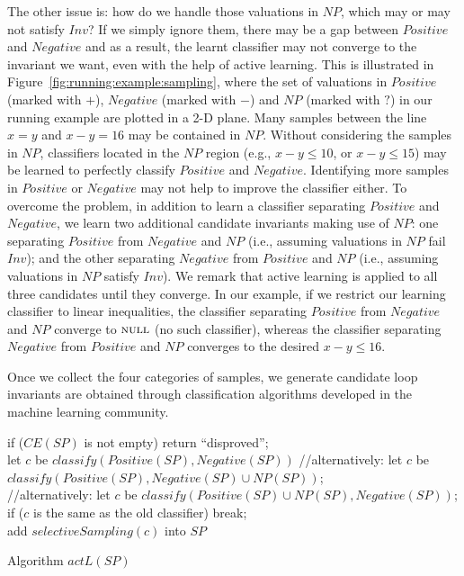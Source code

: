 The other issue is: how do we handle those valuations in $NP$, which may or may not satisfy $Inv$? If we simply ignore them, there may be a gap between $Positive$ and $Negative$ and as a result, the learnt classifier may not converge to the invariant we want, even with the help of active learning.
This is illustrated in Figure~\ref{fig:running:example:sampling}, where the set of valuations in $Positive$ (marked with $+$), $Negative$ (marked with $-$) and $NP$ (marked with $?$) in our running example are plotted in a 2-D plane. Many samples between the line $x=y$ and $x-y=16$ may be contained in $NP$. Without considering the samples in $NP$, classifiers located in the $NP$ region (e.g., $x - y \leq 10$, or $x - y \leq 15$) may be learned to perfectly classify $Positive$ and $Negative$. Identifying more samples in $Positive$ or $Negative$ may not help to improve the classifier either. To overcome the problem, in addition to learn a classifier separating $Positive$ and $Negative$, we learn two additional candidate invariants making use of $NP$:
one separating $Positive$ from $Negative$ and $NP$ (i.e., assuming valuations in $NP$ fail $Inv$);
and the other separating $Negative$ from $Positive$ and $NP$ (i.e., assuming valuations in $NP$ satisfy $Inv$).
We remark that active learning is applied to all three candidates until they converge.
In our example, if we restrict our learning classifier to linear inequalities, the classifier separating $Positive$ from $Negative$ and $NP$ converge to $\textsc{null}$ (no such classifier), whereas the classifier separating $Negative$ from $Positive$ and $NP$ converges to the desired $x - y \leq 16$.

Once we collect the four categories of samples, we generate candidate loop invariants are obtained through classification algorithms developed in the machine learning community.

\begin{algorithm}[t]
\SetAlgoVlined
\Indm
\Indp
{} {
    if ($CE(SP)$ is not empty) { return ``disproved''; } \\
    let $c$ be $classify(Positive(SP), Negative(SP))$\;
    //alternatively: let $c$ be $classify(Positive(SP), Negative(SP) \cup NP(SP))$; \\
    //alternatively: let $c$ be $classify(Positive(SP) \cup NP(SP), Negative(SP))$; \\
    if ($c$ is the same as the old classifier){ break; } \\
    add $selectiveSampling(c)$ into $SP$\;
}
\caption{Algorithm $actL(SP)$}
\label{classification}
\end{algorithm}



